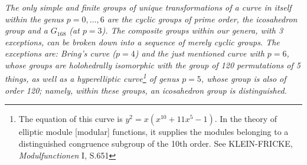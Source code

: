 \documentclass[leqno]{article}
\begin{document}
\textit{The only simple and finite groups of unique transformations of a curve in itself within the genus $p=0, \dots, 6$ are the cyclic groups of prime order, the icosahedron group and a $G_{168}$ (at $p=3$). The composite groups within our genera, with 3 exceptions, can be broken down into a sequence of merely cyclic groups. The exceptions are: Bring's curve ($p=4$) and the just mentioned curve with $p=6$, whose groups are holohedrally isomorphic with the group of 120 permutations of 5 things, as well as a hyperelliptic curve\footnote{The equation of this curve is $y^2 = x(x^{10} + 11x^5-1)$. In the theory of elliptic module [modular] functions, it supplies the modules belonging to a distinguished congruence subgroup of the 10th order. See KLEIN-FRICKE, \textit{Modulfunctionen} I, S.651} of genus $p=5$, whose group is also of order 120; namely, within these groups, an icosahedron group is distinguished.}
\end{document}
